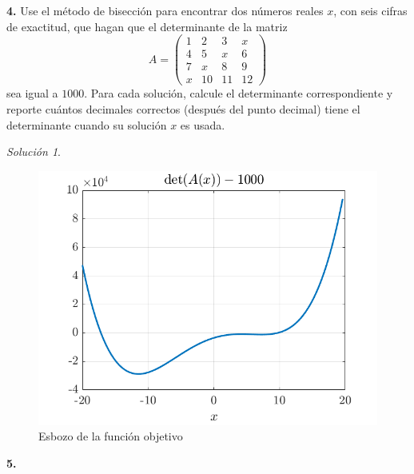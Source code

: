 \documentclass{article}
\newenvironment{statement}[1]{\smallskip\noindent\color[rgb]{1.00,0.00,0.50} {\bf #1.}}{}
\theoremstyle{definition}
\theoremstyle{remark}
\newtheorem*{solution}{Soluci\'on}
\begin{document}
\begin{statement}{4}
  Use el m\'etodo de bisecci\'on para encontrar dos n\'umeros reales $x$, con
  seis cifras de exactitud, que hagan que el determinante de la matriz
  \[
    A = \begin{pmatrix}
      1 & 2 & 3 & x \\
      4 & 5 & x & 6 \\
      7 & x & 8 & 9 \\
      x & 10 & 11 & 12
    \end{pmatrix}  
  \]
  sea igual a $1000$. Para cada soluci\'on, calcule el determinante
  correspondiente y reporte cu\'antos decimales correctos (despu\'es del punto
  decimal) tiene el determinante cuando su soluci\'on $x$ es usada.
\end{statement}

\begin{solution}
  \begin{figure}[h!]
    \centering
    \includegraphics[scale=0.5]{graphics/plot.png}
    \caption{Esbozo de la funci\'on objetivo}
  \end{figure}
\end{solution}

\begin{statement}{5}

\end{statement}
\end{document}
